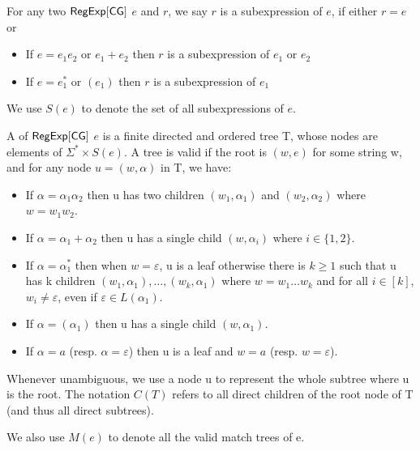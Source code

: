   
  
  
  
  \begin{definition}[Subexpression]
  	For any two ${\sf RegExp}[\sf CG]$ $e$ and $r$, we say $r$ is a subexpression of $e$,
  	if either $r=e$ or
  	\begin{itemize}
  		\item If $e = e_1 e_2$ or $e_1 + e_2$ then $r$ is a subexpression of $e_1$
  		or $e_2$
  		
  		\item If $e = e_1^{\ast}$ or $(e_1)$ then $r$ is a subexpression of $e_1$
  	\end{itemize}
  	We use $S (e)$ to denote the set of all subexpressions of $e$.
  \end{definition}
  
  
  \begin{definition}
  	A  of ${\sf RegExp}[\sf CG]$ $e$ is a finite directed and ordered
  	tree T, whose nodes are elements of $\Sigma^{\ast} \times S (e)$. A tree
  	is valid if the root is $(w, e)$ for some string w, and for any node $u =
  	(w, \alpha)$ in T, we have:
  	\begin{itemize}
  		\item If $\alpha = \alpha_1 \alpha_2$ then u has two children $(w_1,
  		\alpha_1)$ and $(w_2, \alpha_2)$ where $w = w_1 w_2$.
  		
  		\item If $\alpha = \alpha_1 + \alpha_2$ then u has a single child $(w,
  		\alpha_i)$ where $i \in \{ 1, 2 \}$.
  		
  		\item If $\alpha = \alpha_1^{\ast}$ then when $w = \varepsilon$, u is a
  		leaf otherwise there is $k \geqslant 1$ such that u has k children $(w_1,
  		\alpha_1), \ldots, (w_k, \alpha_1)$ where $w = w_1 \ldots w_k$ and for all
  		$i \in [k]$, $w_i \neq \varepsilon$, even if $\varepsilon \in L
  		(\alpha_1)$.
  		
  		\item If $\alpha = (\alpha_1)$ then u has a single child $(w, \alpha_1)$.
  		
  		\item If $\alpha = a$ (resp. $\alpha = \varepsilon$) then u is a leaf and
  		$w = a$ (resp. $w = \varepsilon$).
  	\end{itemize}
  	
  	Whenever unambiguous, we use a node u to represent the whole subtree
  	where u is the root. The notation $C(T)$ refers to all direct children of the root node of T
  	(and thus all direct subtrees).
  	
  	We also use $M (e)$ to denote all the valid match trees of e.
  \end{definition}
  
